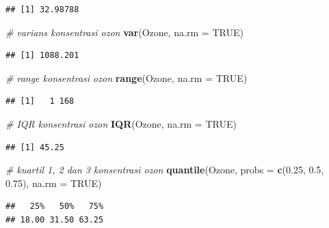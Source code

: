 \documentclass[]{book}
\newenvironment{Shaded}{\begin{snugshade}}{\end{snugshade}}
\newcommand{\CommentTok}[1]{\textcolor[rgb]{0.56,0.35,0.01}{\textit{#1}}}
\newcommand{\DataTypeTok}[1]{\textcolor[rgb]{0.13,0.29,0.53}{#1}}
\newcommand{\FloatTok}[1]{\textcolor[rgb]{0.00,0.00,0.81}{#1}}
\newcommand{\KeywordTok}[1]{\textcolor[rgb]{0.13,0.29,0.53}{\textbf{#1}}}
\newcommand{\NormalTok}[1]{#1}
\newcommand{\OtherTok}[1]{\textcolor[rgb]{0.56,0.35,0.01}{#1}}
\theoremstyle{definition}
\theoremstyle{definition}
\theoremstyle{definition}
\theoremstyle{remark}
\begin{document}
\begin{verbatim}
## [1] 32.98788
\end{verbatim}

\begin{Shaded}
\begin{Highlighting}[]
\CommentTok{# varians konsentrasi ozon}
\KeywordTok{var}\NormalTok{(Ozone, }\DataTypeTok{na.rm =} \OtherTok{TRUE}\NormalTok{)}
\end{Highlighting}
\end{Shaded}

\begin{verbatim}
## [1] 1088.201
\end{verbatim}

\begin{Shaded}
\begin{Highlighting}[]
\CommentTok{# range konsentrasi ozon}
\KeywordTok{range}\NormalTok{(Ozone, }\DataTypeTok{na.rm =} \OtherTok{TRUE}\NormalTok{)}
\end{Highlighting}
\end{Shaded}

\begin{verbatim}
## [1]   1 168
\end{verbatim}

\begin{Shaded}
\begin{Highlighting}[]
\CommentTok{# IQR konsentrasi ozon}
\KeywordTok{IQR}\NormalTok{(Ozone, }\DataTypeTok{na.rm =} \OtherTok{TRUE}\NormalTok{)}
\end{Highlighting}
\end{Shaded}

\begin{verbatim}
## [1] 45.25
\end{verbatim}

\begin{Shaded}
\begin{Highlighting}[]
\CommentTok{# kuartil 1, 2 dan 3 konsentrasi ozon}
\KeywordTok{quantile}\NormalTok{(Ozone, }\DataTypeTok{probs =} \KeywordTok{c}\NormalTok{(}\FloatTok{0.25}\NormalTok{, }\FloatTok{0.5}\NormalTok{, }\FloatTok{0.75}\NormalTok{), }\DataTypeTok{na.rm =} \OtherTok{TRUE}\NormalTok{)}
\end{Highlighting}
\end{Shaded}

\begin{verbatim}
##   25%   50%   75% 
## 18.00 31.50 63.25
\end{verbatim}
\end{document}
